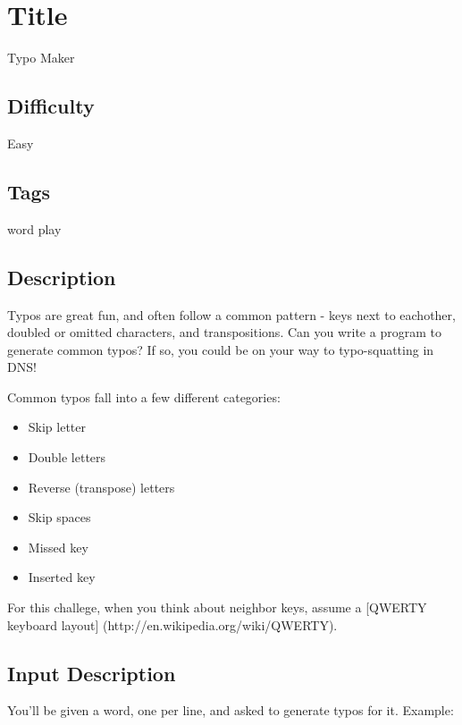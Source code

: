 \section{Title}\label{title-40}

Typo Maker

\subsection{Difficulty}\label{difficulty-39}

Easy

\subsection{Tags}\label{tags-40}

word play

\subsection{Description}\label{description-40}

Typos are great fun, and often follow a common pattern - keys next to
eachother, doubled or omitted characters, and transpositions. Can you
write a program to generate common typos? If so, you could be on your
way to typo-squatting in DNS!

Common typos fall into a few different categories:

\begin{itemize}
\itemsep1pt\parskip0pt
\item
  Skip letter
\item
  Double letters
\item
  Reverse (transpose) letters
\item
  Skip spaces
\item
  Missed key
\item
  Inserted key
\end{itemize}

For this challege, when you think about neighbor keys, assume a
{[}QWERTY keyboard layout{]} (http://en.wikipedia.org/wiki/QWERTY).

\subsection{Input Description}\label{input-description-27}

You'll be given a word, one per line, and asked to generate typos for
it. Example:

